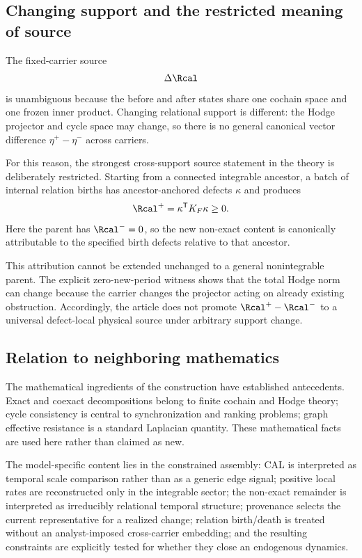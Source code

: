 \subsection{Changing support and the restricted meaning of source}

The fixed-carrier source
\begin{equation}
\Delta\Rcal
\end{equation}
is unambiguous because the before and after states share one cochain space and one frozen inner product. Changing relational support is different: the Hodge projector and cycle space may change, so there is no general canonical vector difference $\eta^+-\eta^-$ across carriers.

For this reason, the strongest cross-support source statement in the theory is deliberately restricted. Starting from a connected integrable ancestor, a batch of internal relation births has ancestor-anchored defects $\kappa$ and produces
\begin{equation}
\Rcal^+=\kappa^{\mathsf T}K_F\kappa\ge0.
\end{equation}
Here the parent has $\Rcal^-=0$, so the new non-exact content is canonically attributable to the specified birth defects relative to that ancestor.

This attribution cannot be extended unchanged to a general nonintegrable parent. The explicit zero-new-period witness shows that the total Hodge norm can change because the carrier changes the projector acting on already existing obstruction. Accordingly, the article does not promote $\Rcal^+-\Rcal^-$ to a universal defect-local physical source under arbitrary support change.

\subsection{Relation to neighboring mathematics}

The mathematical ingredients of the construction have established antecedents. Exact and coexact decompositions belong to finite cochain and Hodge theory; cycle consistency is central to synchronization and ranking problems; graph effective resistance is a standard Laplacian quantity. These mathematical facts are used here rather than claimed as new.

The model-specific content lies in the constrained assembly: CAL is interpreted as temporal scale comparison rather than as a generic edge signal; positive local rates are reconstructed only in the integrable sector; the non-exact remainder is interpreted as irreducibly relational temporal structure; provenance selects the current representative for a realized change; relation birth/death is treated without an analyst-imposed cross-carrier embedding; and the resulting constraints are explicitly tested for whether they close an endogenous dynamics.

